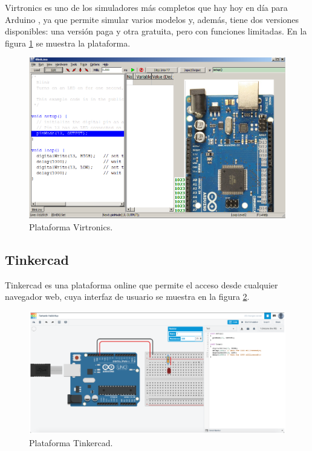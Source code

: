 Virtronics \citep{Virtronics} es uno de los simuladores más completos que hay hoy en día para Arduino \citep{Arduino}, ya que permite simular varios modelos y, además, tiene dos versiones disponibles: una versión paga y otra gratuita, pero con funciones limitadas. En la figura \ref{fig:Virtronics} se muestra la plataforma.

\begin{figure}[ht]
	\centering
	\includegraphics[scale=.35]{./Figures/Virtronics.png}
	\caption{Plataforma Virtronics.}
	\label{fig:Virtronics}
\end{figure}

\subsection{Tinkercad}

Tinkercad \citep{Tinkercad} es una plataforma online que permite el acceso desde cualquier navegador web, cuya interfaz de usuario se muestra en la figura \ref{fig:Tinkercad}.

\begin{figure}[ht]
	\centering
	\includegraphics[scale=.40]{./Figures/Tinkercad.png}
	\caption{Plataforma Tinkercad.}
	\label{fig:Tinkercad}
\end{figure}

